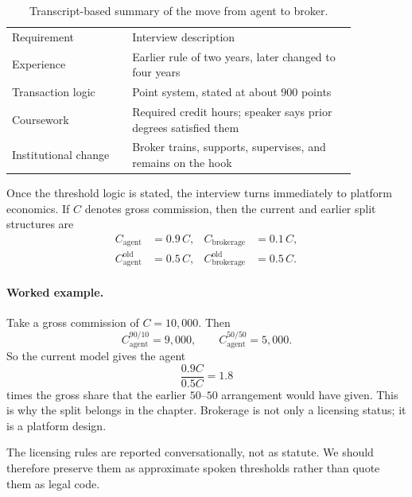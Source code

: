 \begin{table}[h]
\centering
\begin{tabular}{p{0.30\linewidth}p{0.56\linewidth}}
Requirement & Interview description \\
Experience & Earlier rule of two years, later changed to four years \\
Transaction logic & Point system, stated at about \(900\) points \\
Coursework & Required credit hours; speaker says prior degrees satisfied them \\
Institutional change & Broker trains, supports, supervises, and remains on the hook \\
\end{tabular}
\caption{Transcript-based summary of the move from agent to broker.}
\end{table}

Once the threshold logic is stated, the interview turns immediately to platform economics. If \(C\) denotes gross commission, then the current and earlier split structures are
\begin{align}
C_{\mathrm{agent}} &= 0.9\,C,
&
C_{\mathrm{brokerage}} &= 0.1\,C,
\\
C_{\mathrm{agent}}^{\mathrm{old}} &= 0.5\,C,
&
C_{\mathrm{brokerage}}^{\mathrm{old}} &= 0.5\,C.
\end{align}

\paragraph{Worked example.}
Take a gross commission of \(C=10{,}000\). Then
\begin{equation}
C_{\mathrm{agent}}^{90/10}=9{,}000,
\qquad
C_{\mathrm{agent}}^{50/50}=5{,}000.
\end{equation}
So the current model gives the agent
\begin{equation}
\frac{0.9C}{0.5C}=1.8
\end{equation}
times the gross share that the earlier \(50\text{--}50\) arrangement would have given. This is why the split belongs in the chapter. Brokerage is not only a licensing status; it is a platform design.

\begin{remark}
The licensing rules are reported conversationally, not as statute. We should therefore preserve them as approximate spoken thresholds rather than quote them as legal code.
\end{remark}

